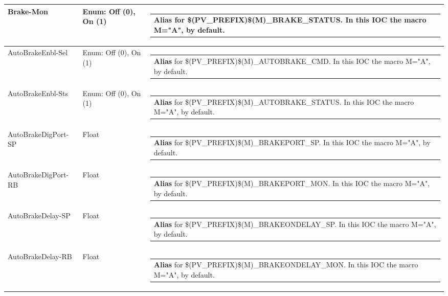 \documentclass[openany]{article}
\begin{document}
\begin{longtable}{| m{4.5cm} m{2.5cm}  m{8.5cm} |}
        Brake-Mon & Enum: Off (0), On (1) & \begin{tabular}{@{}m{6cm}@{}}
                \textbf{\color{blue} Alias} for \$(PV\_PREFIX)\$(M)\_BRAKE\_STATUS. In this IOC the macro M="A", by default.
            \end{tabular} \hypertarget{pv:auto-brake-enbl}{}\\ \hline
        AutoBrakeEnbl-Sel & Enum: Off (0), On (1) & \begin{tabular}{@{}m{6cm}@{}}
                \textbf{\color{blue} Alias} for \$(PV\_PREFIX)\$(M)\_AUTOBRAKE\_CMD. In this IOC the macro M="A", by default.
            \end{tabular} \hypertarget{}{}\\ \hline
        AutoBrakeEnbl-Sts & Enum: Off (0), On (1) & \begin{tabular}{@{}m{6cm}@{}}
                \textbf{\color{blue} Alias} for \$(PV\_PREFIX)\$(M)\_AUTOBRAKE\_STATUS. In this IOC the macro M="A", by default.
            \end{tabular} \hypertarget{pv:auto-brake-dig-port}{}\\ \hline
        AutoBrakeDigPort-SP & Float & \begin{tabular}{@{}m{6cm}@{}}
                \textbf{\color{blue} Alias} for \$(PV\_PREFIX)\$(M)\_BRAKEPORT\_SP. In this IOC the macro M="A", by default.
            \end{tabular} \hypertarget{}{}\\ \hline
        AutoBrakeDigPort-RB & Float & \begin{tabular}{@{}m{6cm}@{}}
                \textbf{\color{blue} Alias} for \$(PV\_PREFIX)\$(M)\_BRAKEPORT\_MON. In this IOC the macro M="A", by default.
            \end{tabular} \hypertarget{pv:auto-brake-delay}{}\\ \hline
        AutoBrakeDelay-SP & Float & \begin{tabular}{@{}m{6cm}@{}}
                \textbf{\color{blue} Alias} for \$(PV\_PREFIX)\$(M)\_BRAKEONDELAY\_SP. In this IOC the macro M="A", by default.
            \end{tabular} \hypertarget{}{}\\ \hline
        AutoBrakeDelay-RB & Float & \begin{tabular}{@{}m{6cm}@{}}
                \textbf{\color{blue} Alias} for \$(PV\_PREFIX)\$(M)\_BRAKEONDELAY\_MON. In this IOC the macro M="A", by default.

\end{tabular}
\end{longtable}
\end{document}
